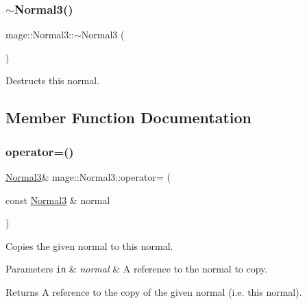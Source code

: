 \subsubsection{\texorpdfstring{$\sim$\+Normal3()}{~Normal3()}}
{\footnotesize\ttfamily mage\+::\+Normal3\+::$\sim$\+Normal3 (\begin{DoxyParamCaption}{ }\end{DoxyParamCaption})\hspace{0.3cm}{\ttfamily [default]}}

Destructs this normal. 

\subsection{Member Function Documentation}
\hypertarget{structmage_1_1_normal3_ad446f029ba58615f98b4da13e7e4c5ba}{}\label{structmage_1_1_normal3_ad446f029ba58615f98b4da13e7e4c5ba} 
\subsubsection{\texorpdfstring{operator=()}{operator=()}\hspace{0.1cm}{\footnotesize\ttfamily [1/2]}}
{\footnotesize\ttfamily \hyperlink{structmage_1_1_normal3}{Normal3}\& mage\+::\+Normal3\+::operator= (\begin{DoxyParamCaption}\item[{const \hyperlink{structmage_1_1_normal3}{Normal3} \&}]{normal }\end{DoxyParamCaption})\hspace{0.3cm}{\ttfamily [default]}}

Copies the given normal to this normal.


\begin{DoxyParams}[1]{Parameters}
\mbox{\tt in}  & {\em normal} & A reference to the normal to copy. \\
\hline
\end{DoxyParams}
\begin{DoxyReturn}{Returns}
A reference to the copy of the given normal (i.\+e. this normal). 
\end{DoxyReturn}
\hypertarget{structmage_1_1_normal3_ab8fd629ae1e399b468a229fc4ea58222}{}\label{structmage_1_1_normal3_ab8fd629ae1e399b468a229fc4ea58222} 
